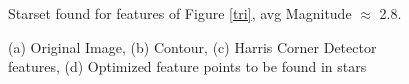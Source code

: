 \documentclass[paper=a4, fontsize=11pt]{scrartcl} %
\begin{document}
\begin{figure}[!h]
\caption{Starset found for features of Figure \ref{tri}, avg Magnitude $\approx$ 2.8. }
\label{tristar}
\end{figure}

\begin{figure}[!h]
\caption{(a) Original Image, (b) Contour, (c) Harris Corner Detector features, (d) Optimized feature points to be found in stars}
\label{sword}
\end{figure}
\end{document}

